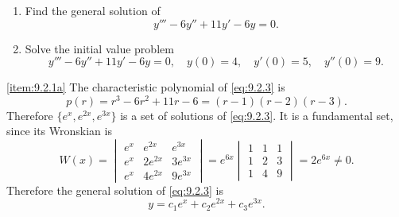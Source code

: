 \documentclass{ximera}
\begin{document}
\begin{example}\label{example:9.2.1} 
\begin{enumerate}
\item\label{item:9.2.1a} %
Find the general solution of
\begin{equation} \label{eq:9.2.3}
y'''-6y''+11y'-6y=0.
\end{equation}
\item\label{item:9.2.1b} %
Solve the initial value problem
\begin{equation} \label{eq:9.2.4}
y'''-6y''+11y'-6y=0, \quad  y(0)=4,\quad y'(0)=5,\quad y''(0)=9.
\end{equation}
\end{enumerate}


\begin{explanation} \ref{item:9.2.1a} The characteristic polynomial of
\eqref{eq:9.2.3} is
$$
p(r)=r^3-6r^2+11r-6=(r-1)(r-2)(r-3).
$$
Therefore $\{e^x,e^{2x},e^{3x}\}$ is a set of solutions of
\eqref{eq:9.2.3}. It is a fundamental set, since its Wronskian is
$$
W(x)=\begin{vmatrix}e^x&e^{2x}&e^{3x}\\e^x&2e^{2x}&
3e^{3x}\\e^x&4e^{2x}&9e^{3x}\end{vmatrix}=
e^{6x}\begin{vmatrix}1&1&1\\1&2&
3\\1&4&9\end{vmatrix}=2e^{6x}\neq 0.
$$
Therefore the general solution of \eqref{eq:9.2.3} is
\begin{equation} \label{eq:9.2.5}
y=c_1e^{x}+c_2e^{2x}+c_3e^{3x}.
\end{equation}


\end{explanation}
\end{example}
\end{document}
